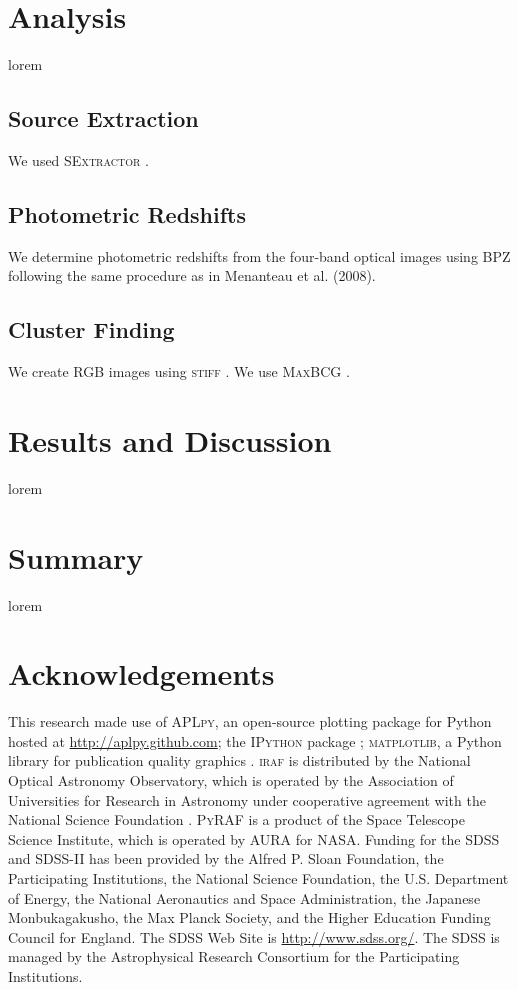 \documentclass[apj, revtex4]{emulateapj}
\begin{document}
\section{Analysis}\label{sec:analysis}
lorem

\subsection{Source Extraction}
We used \textsc{SExtractor} \citep{Bertin1996}.

\subsection{Photometric Redshifts}
We determine photometric redshifts from the four-band optical images using BPZ \citep{Benitez2000} following the same
procedure as in Menanteau et al. (2008).

\subsection{Cluster Finding}
We create RGB images using \textsc{stiff} \citep{Bertin2011}.
We use \textsc{MaxBCG} \citep{Koester2007b}.

\section{Results and Discussion}\label{sec:results}

lorem

\section{Summary}\label{sec:summary}

lorem

\section*{Acknowledgements} This research made use of \textsc{APLpy}, an open-source plotting package for Python hosted at \url{http://aplpy.github.com}; the \textsc{IPython} package \citep{Perez2007}; \textsc{matplotlib}, a Python library for publication quality graphics \citep{Hunter2007}. \textsc{iraf} is distributed by the National Optical Astronomy Observatory, which is operated by the Association of Universities for Research in Astronomy under cooperative agreement with the National Science Foundation \citep{Tody1993}. \textsc{PyRAF} is a product of the Space Telescope Science Institute, which is operated by AURA for NASA. Funding for the SDSS and SDSS-II has been provided by the Alfred P. Sloan Foundation, the Participating Institutions, the National Science Foundation, the U.S. Department of Energy, the National Aeronautics and Space Administration, the Japanese Monbukagakusho, the Max Planck Society, and the Higher Education Funding Council for England. The SDSS Web Site is \url{http://www.sdss.org/}. The SDSS is managed by the Astrophysical Research Consortium for the Participating Institutions.




\end{document}
